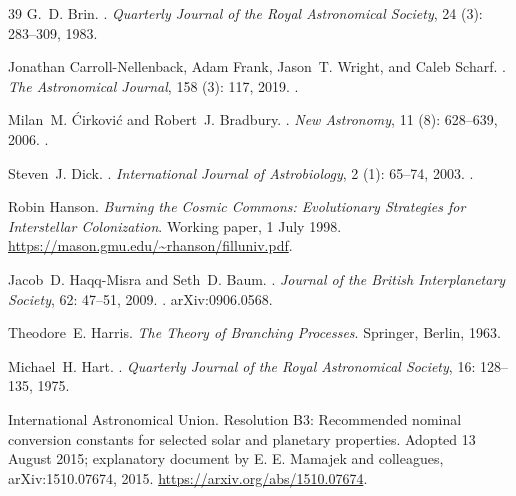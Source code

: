 \begin{thebibliography}{39}
G.~D. Brin.
.
\newblock \emph{Quarterly Journal of the Royal Astronomical Society},
  24 (3): 283--309, 1983.

Jonathan Carroll-Nellenback, Adam Frank, Jason~T. Wright, and Caleb Scharf.
.
\newblock \emph{The Astronomical Journal}, 158 (3): 117,
  2019.
\newblock {}.

Milan~M. \'Cirkovi\'c and Robert~J. Bradbury.
.
\newblock \emph{New Astronomy}, 11 (8): 628--639, 2006.
\newblock {}.

Steven~J. Dick.
.
\newblock \emph{International Journal of Astrobiology}, 2
  (1): 65--74, 2003.
\newblock {}.

Robin Hanson.
\newblock \emph{Burning the Cosmic Commons: Evolutionary Strategies for
Interstellar Colonization}.
\newblock Working paper, 1 July 1998.
\newblock \url{https://mason.gmu.edu/~rhanson/filluniv.pdf}.

Jacob~D. Haqq-Misra and Seth~D. Baum.
.
\newblock \emph{Journal of the British Interplanetary Society}, 62:
  47--51, 2009.
\newblock {}.
\newblock arXiv:0906.0568.

Theodore~E. Harris.
\newblock \emph{{The Theory of Branching Processes}}.
\newblock Springer, Berlin, 1963.

Michael~H. Hart.
.
\newblock \emph{Quarterly Journal of the Royal Astronomical Society},
  16: 128--135, 1975.

International Astronomical Union.
\newblock Resolution B3: Recommended nominal conversion constants for
selected solar and planetary properties.
\newblock Adopted 13 August 2015; explanatory document by E. E. Mamajek
and colleagues, arXiv:1510.07674, 2015.
\newblock \url{https://arxiv.org/abs/1510.07674}.


\end{thebibliography}
